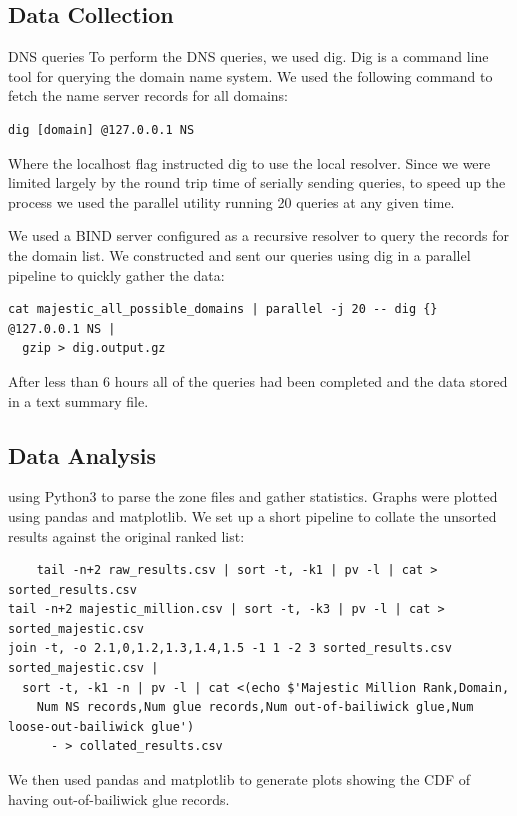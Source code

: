 \documentclass{idc_msc}
\begin{document}


\subsection{Data Collection}

DNS queries
To perform the DNS queries, we used dig. Dig is a command line tool for querying the domain name system. We used the following command to fetch the name server records for all domains:
\begin{verbatim}
dig [domain] @127.0.0.1 NS
\end{verbatim}
Where the localhost flag instructed dig to use the local resolver.
Since we were limited largely by the round trip time of serially sending queries, to speed up the process we used the parallel utility running 20 queries at any given time.

We used a BIND server configured as a recursive resolver to query the records for the domain list.
We constructed and sent our queries using dig in a parallel \cite{Tange2011a} pipeline to quickly gather the data:

\begin{verbatim}
cat majestic_all_possible_domains | parallel -j 20 -- dig {} @127.0.0.1 NS | 
  gzip > dig.output.gz
\end{verbatim}

After less than 6 hours all of the queries had been completed and the data stored in a text summary file.

\subsection{Data Analysis}

using Python3 to parse the zone files and gather statistics. Graphs were plotted using pandas and matplotlib.
We set up a short pipeline to collate the unsorted results against the original ranked list:
\begin{verbatim}
	tail -n+2 raw_results.csv | sort -t, -k1 | pv -l | cat > sorted_results.csv
tail -n+2 majestic_million.csv | sort -t, -k3 | pv -l | cat > sorted_majestic.csv
join -t, -o 2.1,0,1.2,1.3,1.4,1.5 -1 1 -2 3 sorted_results.csv sorted_majestic.csv | 
  sort -t, -k1 -n | pv -l | cat <(echo $'Majestic Million Rank,Domain,
    Num NS records,Num glue records,Num out-of-bailiwick glue,Num loose-out-bailiwick glue') 
      - > collated_results.csv
\end{verbatim}
We then used pandas and matplotlib to generate plots showing the CDF of having out-of-bailiwick glue records.
\end{document}
